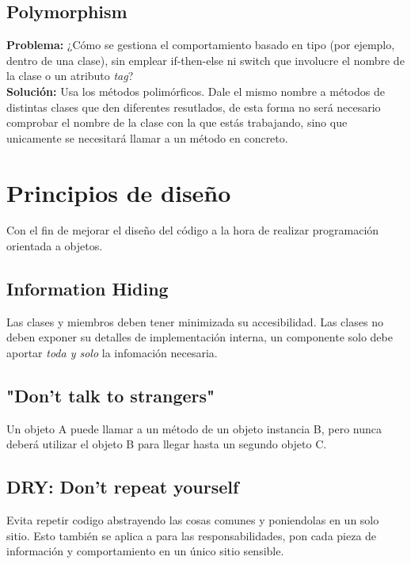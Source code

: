 \documentclass[11pt]{article}
\theoremstyle{plain}
\begin{document}
        \subsection{Polymorphism} %
        \label{sub:polymorphism}
        \begin{center}
            \textbf{Problema:} ¿Cómo se gestiona el comportamiento basado en tipo (por ejemplo, dentro de una clase), sin emplear if-then-else ni switch que involucre el nombre de la clase o un atributo \textit{tag}?\\ 
            \textbf{Solución:} Usa los métodos polimórficos. Dale el mismo nombre a métodos de distintas clases que den diferentes resutlados, de esta forma no será necesario comprobar el nombre de la clase con la que estás trabajando, sino que unicamente se necesitará llamar a un método en concreto.
        \end{center}
    \section{Principios de diseño} %
    \label{sec:principios_de_diseño}
        Con el fin de mejorar el diseño del código a la hora de realizar programación orientada a objetos.
        \subsection{Information Hiding} %
        \label{sub:information_hiding}
            Las clases y miembros deben tener minimizada su accesibilidad. Las clases no deben exponer su detalles de implementación interna, un componente solo debe aportar \textit{toda y solo} la infomación necesaria.
        \subsection{"Don't talk to strangers"} %
        \label{sub:_don_t_talk_to_strangers_}
            Un objeto A puede llamar a un método de un objeto instancia B, pero nunca deberá utilizar el objeto B para llegar hasta un segundo objeto C.
        
        \subsection{DRY: Don't repeat yourself} %
        \label{sub:dry_don_t_repeat_yourself}
            Evita repetir codigo abstrayendo las cosas comunes y poniendolas en un solo sitio. Esto también se aplica a para las responsabilidades, pon cada pieza de información y comportamiento en un único sitio sensible.
\end{document}

